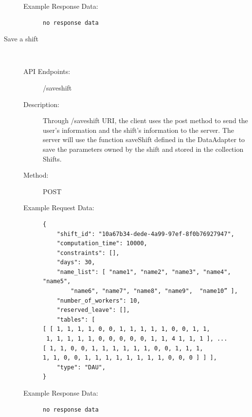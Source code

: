 \documentclass[11pt, oneside]{article}   	%
\begin{document}
\begin{description}
\begin{description}
\begin{verbatim}
\end{verbatim}
\item[Example Response Data:]
\begin{verbatim}
no response data
\end{verbatim}
\end{description}






\item[Save a shift]
\
\begin{description}
\item[API Endpoints:] /saveshift
\item[Description:]Through /saveshift URI, the client uses the post method to send the user’s information and the shift’s information to the server. 
The server will use the function saveShift defined in the DataAdapter to save the parameters owned by the shift and stored in the collection Shifts.

\item[Method:] POST
\item[Example Request Data:]
\begin{verbatim}
{
    "shift_id": "10a67b34-dede-4a99-97ef-8f0b76927947",
    "computation_time": 10000,
    "constraints": [],
    "days": 30,
    "name_list": [ "name1", "name2", "name3", "name4", "name5",
        "name6", "name7", "name8", "name9",  "name10” ],
    "number_of_workers": 10,
    "reserved_leave": [],
    "tables": [
[ [ 1, 1, 1, 1, 0, 0, 1, 1, 1, 1, 1, 0, 0, 1, 1,
 1, 1, 1, 1, 1, 0, 0, 0, 0, 0, 1, 1, 4 1, 1, 1 ], ...
[ 1, 1, 0, 0, 1, 1, 1, 1, 1, 1, 0, 0, 1, 1, 1, 
1, 1, 0, 0, 1, 1, 1, 1, 1, 1, 1, 1, 0, 0, 0 ] ] ],
    "type": "DAU",
}
\end{verbatim}
\item[Example Response Data:]
\begin{verbatim}
no response data
\end{verbatim}
\end{description}




\end{description}
\end{document}
